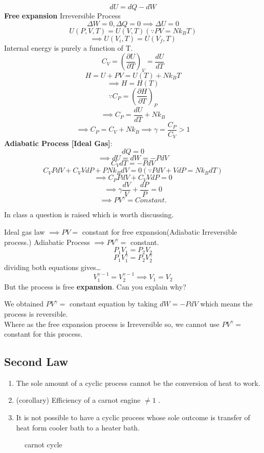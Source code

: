 \[
    dU = dQ - dW
\]
\textbf{Free} \textbf{expansion} 
Irreversible Process
\[
    \Delta W = 0, \Delta Q = 0 \implies \Delta U = 0
\]
\[
    U(P,V,T) = U(V,T) \left(\because PV = Nk_{B}T\right)
\]
\[
    \implies U(V_{i} , T) = U(V_{f} , T)
\]
Internal energy is purely a function of T.
\[
    C_{V} =\left(\frac{\partial U}{\partial T}\right)_{V}  = \frac{dU}{dT}
\]
\[
    H = U + PV = U(T)+N k_{B} T 
\]
\[
    \implies H=H(T) 
\]
\[
   \because C_{P} = \left(\frac{\partial H}{\partial T}\right)_{P} 
\]
\[
   \implies C_P = \frac{dU}{dT} + N k_{B} 
\]
\[
    \implies C_P = C_V + N k_{B} \implies \gamma = \frac{C_{P} }{C_{V}}>1
\]\newpage
\textbf{Adiabatic Process [Ideal Gas]}:\\
\[
    dQ = 0
\]
\[
    \implies dU = dW = -PdV
\]
\[
    C_{V} dT = -P dV
\]
\[
    C_{V} PdV + C_{V} VdP + P N k_{B} dV = 0 \left(\because PdV + VdP = N k_{B} dT \right)
\]
\[
  \implies   C_{P} P dV + C_{V} V dP = 0
\]
\[
    \implies \gamma \frac{dV}{V} + \frac{dP}{P} = 0
\]
\[
    \implies PV^\gamma = Constant.
\]
\begin{note}
    In class a question is raised which is worth discussing.
    \begin{exercise}
        Ideal gas law \(\implies PV = \) constant for free expansion(Adiabatic Irreversible process.)
        Adiabatic Process \(\implies PV^\gamma =\)  constant.
        \[
            P_1 V_1 = P_2 V_2
        \]
        \[
            P_1 V_1 ^ \gamma = P_2 V_2 ^ \gamma
        \]
        dividing both equations gives\dots
        \[
            V_1 ^ {\gamma-1} = V_2 ^ {\gamma -1} \implies V_1 = V_2 
        \]
        But the process is free \textbf{expansion}.
        Can you explain why?
        \begin{answer}
            We obtained \(PV^\gamma =\) constant equation by taking $dW = -PdV$ which means the process is reversible.\\
            Where as the free expansion process is Irreversible so, we cannot use \(PV^\gamma =\) constant for this process.
        \end{answer}
    \end{exercise}
\end{note}
\subsection{Second Law}
\begin{definition}
    \begin{enumerate}
        \item The sole amount of a cyclic process cannot be the conversion of heat to work. 
        \item (corollary) Efficiency of a carnot engine \(\neq  1\) . 
        \item It is not possible to have a cyclic process whose sole outcome is transfer of heat form cooler bath to a heater bath.
    \end{enumerate}
\end{definition}
\begin{figure}[H]
    \centering
    \caption{carnot cycle}
    \label{fig:carnot}
\end{figure}